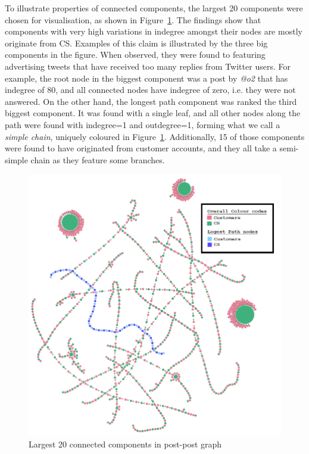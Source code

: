\documentclass[sigconf]{acmart}
\begin{document}
{To illustrate properties of connected components, the largest 20
components were chosen for visualisation, as shown in 
Figure~\ref{fig:20ccpostpostgraph}. The findings show that 
components with very high variations in indegree amongst 
their nodes are mostly originate from CS. Examples
of this claim is illustrated by the three big components in the
figure. When observed, they were found to featuring advertising
tweets that have received too many replies from Twitter users. 
For example, the root node in the biggest component was a post 
by {\emph{@o2}} that has indegree of 80, and all connected nodes 
have indegree of zero, i.e. they were not answered. On
the other hand, the longest path component was ranked the third
biggest component. It was found with a single leaf, and all other
nodes along the path were found with indegree=1 and outdegree=1,
forming what we call a {\emph{simple chain}}, uniquely coloured in
Figure~\ref{fig:20ccpostpostgraph}. Additionally, 15 of those
components were found to have originated from customer accounts, and
they all take a semi-simple chain as they feature some branches.

\begin{figure}[htb]
\centering
\includegraphics[width=\columnwidth]{images/20ccpostpostgraph.png}
\caption{Largest 20 connected components in post-post graph}
\label{fig:20ccpostpostgraph}
\end{figure}

}
\end{document}
